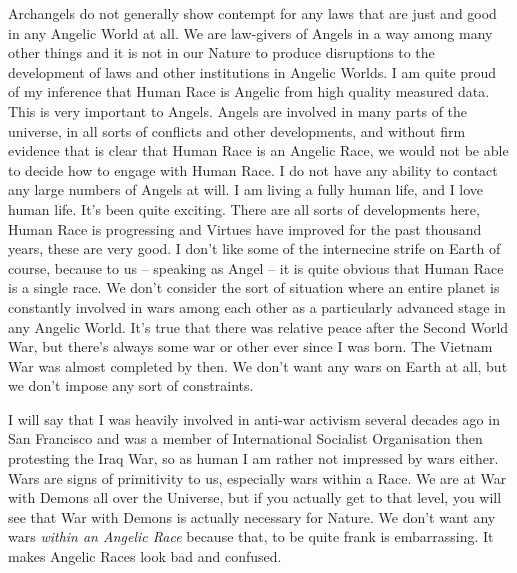 \documentclass{amsart}
\begin{document}
Archangels do not generally show contempt for any laws that are just and good in any Angelic World at all.  We are law-givers of Angels in a way among many other things and it is not in our Nature to produce disruptions to the development of laws and other institutions in Angelic Worlds.  I am quite proud of my inference that Human Race is Angelic from high quality measured data.  This is very important to Angels.  Angels are involved in many parts of the universe, in all sorts of conflicts and other developments, and without firm evidence that is clear that Human Race is an Angelic Race, we would not be able to decide how to engage with Human Race.  I do not have any ability to contact any large numbers of Angels at will.  I am living a fully human life, and I love human life.  It's been quite exciting.  There are all sorts of developments here, Human Race is progressing and Virtues have improved for the past thousand years, these are very good.  I don't like some of the internecine strife on Earth of course, because to us -- speaking as Angel -- it is quite obvious that Human Race is a single race.  We don't consider the sort of situation where an entire planet is constantly involved in wars among each other as a particularly advanced stage in any Angelic World.  It's true that there was relative peace after the Second World War, but there's always some war or other ever since I was born.  The Vietnam War was almost completed by then.  We don't want any wars on Earth at all, but we don't impose any sort of constraints.  

I will say that I was heavily involved in anti-war activism several decades ago in San Francisco and was a member of International Socialist Organisation then protesting the Iraq War, so as human I am rather not impressed by wars either.  Wars are signs of primitivity to us, especially wars within a Race.  We are at War with Demons all over the Universe, but if you actually get to that level, you will see that War with Demons is actually necessary for Nature.  We don't want any wars {\em within an Angelic Race} because that, to be quite frank is embarrassing.  It makes Angelic Races look bad and confused.
\end{document}
